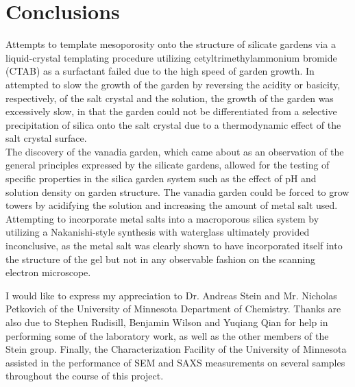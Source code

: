 \documentclass[
journal=jacsat, %
manuscript=article]{achemso}
\begin{document}
\section*{Conclusions}
Attempts to template mesoporosity onto the structure of silicate gardens via a liquid-crystal templating procedure utilizing cetyltrimethylammonium bromide (CTAB) as a surfactant failed due to the high speed of garden growth. In attempted to slow the growth of the garden by reversing the acidity or basicity, respectively, of the salt crystal and the solution, the growth of the garden was excessively slow, in that the garden could not be differentiated from a selective precipitation of silica onto the salt crystal due to a thermodynamic effect of the salt crystal surface. \\
The discovery of the vanadia garden, which came about as an observation of the general principles expressed by the silicate gardens, allowed for the testing of specific properties in the silica garden system such as the effect of pH and solution density on garden structure. The vanadia garden could be forced to grow towers by acidifying the solution and increasing the amount of metal salt used. \\
Attempting to incorporate metal salts into a macroporous silica system by utilizing a Nakanishi-style synthesis with waterglass ultimately provided inconclusive, as the metal salt was clearly shown to have incorporated itself into the structure of the gel but not in any observable fashion on the scanning electron microscope.

\acknowledgement
I would like to express my appreciation to Dr. Andreas Stein and Mr. Nicholas Petkovich of the University of Minnesota Department of Chemistry. Thanks are also due to Stephen Rudisill, Benjamin Wilson and Yuqiang Qian for help in performing some of the laboratory work, as well as the other members of the Stein group. Finally, the Characterization Facility of the University of Minnesota assisted in the performance of SEM and SAXS measurements on several samples throughout the course of this project.


\suppinfo





\end{document}
